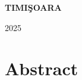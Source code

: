 \documentclass[12pt,a4paper]{book}
\theoremstyle{definition}
\theoremstyle{remark}
\begin{document}
\vfill
\begin{center}
{\bf TIMI\c SOARA

2025}
\end{center}


\newpage
\normalsize{}



\section*{Abstract} 


\newpage
\normalsize{}

\tableofcontents





% 



\end{document}
